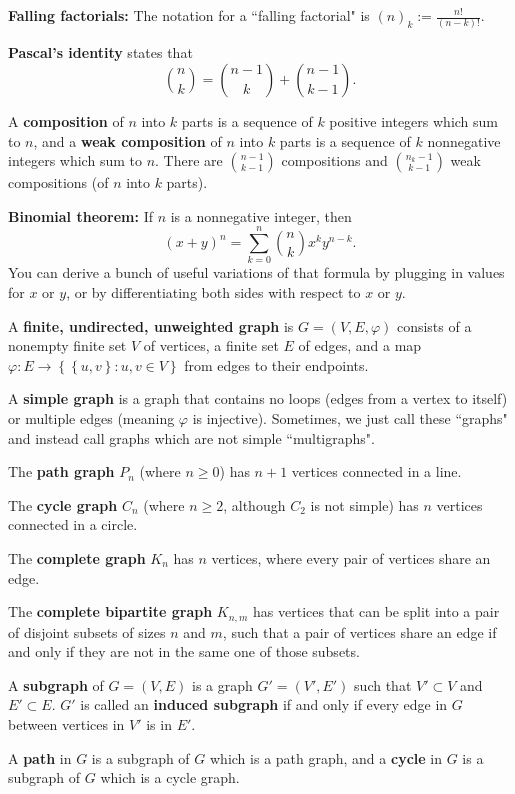 \documentclass[12pt]{article}
\begin{document}
\textbf{Falling factorials:} The notation for a ``falling factorial" is $(n)_k := \frac{n!}{(n-k)!}$.
\par
\textbf{Pascal's identity} states that
\[ \binom{n}{k} = \binom{n-1}{k} + \binom{n-1}{k-1}. \]
\par
A \textbf{composition} of $n$ into $k$ parts is a sequence of $k$ positive integers which sum to $n$, and a \textbf{weak composition} of $n$ into $k$ parts is a sequence of $k$ nonnegative integers which sum to $n$. There are $\binom{n-1}{k-1}$ compositions and $\binom{n_k-1}{k-1}$ weak compositions (of $n$ into $k$ parts).
\par
\textbf{Binomial theorem:} If $n$ is a nonnegative integer, then
\[ (x+y)^n = \sum_{k=0}^n \binom{n}{k} x^ky^{n-k}. \]
You can derive a bunch of useful variations of that formula by plugging in values for $x$ or $y$, or by differentiating both sides with respect to $x$ or $y$.
\par
A \textbf{finite, undirected, unweighted graph} is $G=(V,E,\varphi)$ consists of a nonempty finite set $V$ of vertices, a finite set $E$ of edges, and a map $\varphi: E \rightarrow \left\{ \left\{ u,v \right\}: u,v \in V \right\}$ from edges to their endpoints.
\par
A \textbf{simple graph} is a graph that contains no loops (edges from a vertex to itself) or multiple edges (meaning $\varphi$ is injective). Sometimes, we just call these ``graphs" and instead call graphs which are not simple ``multigraphs".
\par
The \textbf{path graph} $P_n$ (where $n \geq 0$) has $n+1$ vertices connected in a line.
\par
The \textbf{cycle graph} $C_n$ (where $n \geq 2$, although $C_2$ is not simple) has $n$ vertices connected in a circle.
\par
The \textbf{complete graph} $K_n$ has $n$ vertices, where every pair of vertices share an edge.
\par
The \textbf{complete bipartite graph} $K_{n,m}$ has vertices that can be split into a pair of disjoint subsets of sizes $n$ and $m$, such that a pair of vertices share an edge if and only if they are not in the same one of those subsets.
\par
A \textbf{subgraph} of $G=(V,E)$ is a graph $G' = (V', E')$ such that $V' \subset V$ and $E' \subset E$. $G'$ is called an \textbf{induced subgraph} if and only if every edge in $G$ between vertices in $V'$ is in $E'$.
\par
A \textbf{path} in $G$ is a subgraph of $G$ which is a path graph, and a \textbf{cycle} in $G$ is a subgraph of $G$ which is a cycle graph.
\end{document}
